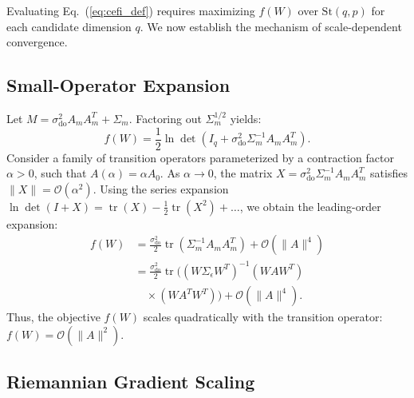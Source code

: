\documentclass[preprint,12pt]{elsarticle}
\begin{document}
Evaluating Eq.~(\ref{eq:cefi_def}) requires maximizing $f(W)$ over $\mathrm{St}(q, p)$ for each candidate dimension $q$. We now establish the mechanism of scale-dependent convergence.

\subsection{Small-Operator Expansion}

Let $M = \sigma_{\mathrm{do}}^2 A_m A_m^T + \Sigma_m$. Factoring out $\Sigma_m^{1/2}$ yields:
\begin{equation}
f(W) = \frac{1}{2} \ln\det\left( I_q + \sigma_{\mathrm{do}}^2 \Sigma_m^{-1} A_m A_m^T \right).
\label{eq:obj_det_form}
\end{equation}
Consider a family of transition operators parameterized by a contraction factor $\alpha > 0$, such that $A(\alpha) = \alpha A_0$. As $\alpha \to 0$, the matrix $X = \sigma_{\mathrm{do}}^2 \Sigma_m^{-1} A_m A_m^T$ satisfies $\|X\| = \mathcal{O}(\alpha^2)$. Using the series expansion $\ln\det(I + X) = \operatorname{tr}(X) - \frac{1}{2}\operatorname{tr}(X^2) + \dots$, we obtain the leading-order expansion:
\begin{equation}
\begin{split}
f(W) &= \frac{\sigma_{\mathrm{do}}^2}{2} \operatorname{tr}\left( \Sigma_m^{-1} A_m A_m^T \right) + \mathcal{O}(\|A\|^4) \\
&= \frac{\sigma_{\mathrm{do}}^2}{2} \operatorname{tr}\big( (W \Sigma_\epsilon W^T)^{-1} (W A W^T) \\
&\quad \times (W A^T W^T) \big) + \mathcal{O}(\|A\|^4).
\end{split}
\label{eq:taylor_expansion}
\end{equation}
Thus, the objective $f(W)$ scales quadratically with the transition operator: $f(W) = \mathcal{O}(\|A\|^2)$.

\subsection{Riemannian Gradient Scaling}
\end{document}
